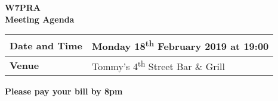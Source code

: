 \documentclass[letter,11pt]{extarticle}
\begin{document}
	\thispagestyle{empty}
	
	\begin{center}
		\textbf{W7PRA\\Meeting Agenda}
		\vspace{0.33cm}
	\end{center}
	
	\begin{center}
		\begin{tabular}{| m{3.0cm} | m{7.5cm} |} \hline
			\textbf{Date and Time} & Monday 18\textsuperscript{th} February 2019 at 19:00 \\ \hline
			\textbf{Venue} & Tommy's 4\textsuperscript{th} Street Bar \& Grill \\ \hline
				\end{tabular}
	\end{center}
	
	\begin{center}
		\textbf{Please pay your bill by 8pm}
	\end{center}
	
\end{document}
